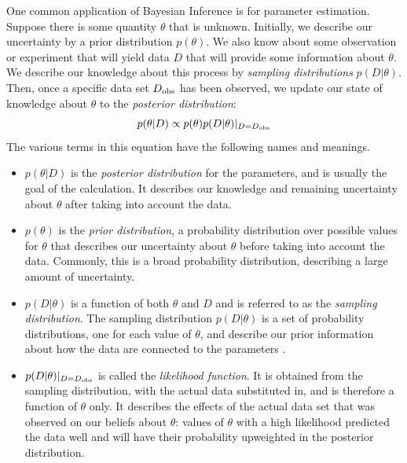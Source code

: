 \documentclass[letterpaper, 11pt]{article}
\begin{document}
One common application of Bayesian Inference is for parameter estimation.
Suppose there is some quantity $\theta$ that is unknown. Initially, we describe
our uncertainty by a prior distribution $p(\theta)$. We also know about some
observation or experiment that will yield data $D$ that will provide some
information about $\theta$. We describe our knowledge about this process by 
{\it sampling distributions} $p(D|\theta)$. Then, once a specific data set
$D_{\rm obs}$ has been observed, we update our state of knowledge about $\theta$
to the {\it posterior distribution}:
\begin{equation}
p(\theta | D) \propto p(\theta) p(D|\theta)|_{D=D_{\rm obs}}
\end{equation}
The various terms in this equation have the following names and meanings.

\begin{itemize}
\item $p(\theta|D)$ is the {\it posterior distribution}
for the parameters, and is usually the goal of the calculation. It describes our
knowledge and remaining uncertainty about $\theta$ after taking into account the data. \\

\item $p(\theta)$ is the {\it prior distribution}, a probability distribution
over possible values for $\theta$ that describes our uncertainty about
$\theta$ before taking into account the data. Commonly, this is a broad
probability distribution, describing a large amount of uncertainty. \\

\item $p(D|\theta)$ is a function of
both $\theta$ and $D$ and is referred to as the {\it sampling distribution}. 
The sampling distribution $p(D|\theta)$ is a set of probability distributions,
one for each value of $\theta$, and describe our prior information about how the data are connected to the parameters \citep{2008arXiv0808.0012C}.

\item $p(D|\theta)|_{D = D_{\rm obs}}$ is called the {\it likelihood function}.
It is obtained from the sampling distribution, with the actual data substituted in,
and is therefore a function of $\theta$ only. It describes the effects of the actual data
set that was observed on our beliefs about $\theta$: values of $\theta$ with a high
likelihood predicted the data well and will have their probability upweighted
in the posterior distribution.
\end{itemize}
\end{document}
